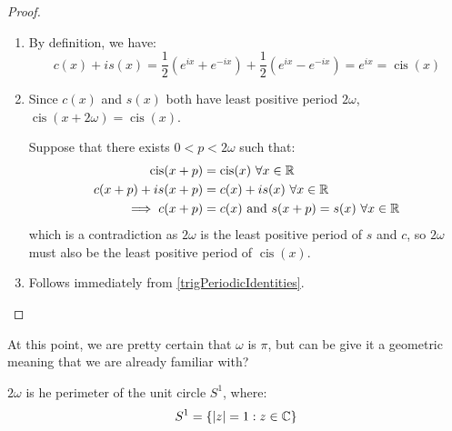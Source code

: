 \documentclass[../main.tex]{subfiles}
\begin{document}
\begin{proof}
  \begin{enumerate}
    \item By definition, we have:
      \[
        c(x) + is(x) = \frac{1}{2}(e^{ix} + e^{-ix}) + \frac{1}{2}(e^{ix} - e^{-ix}) = e^{ix} = \operatorname{cis}(x)
      \]
    \item Since $c(x)$ and $s(x)$ both have least positive period $2\omega$, $\operatorname{cis}(x + 2\omega) = \operatorname{cis}(x)$.

      Suppose that there exists $0 < p < 2\omega$ such that:
      \begin{align*}
        \operatorname{cis}(x + p) &= \operatorname{cis}(x)\ \forall x \in \R \\
        c(x + p) + is(x + p) &= c(x) + is(x)\ \forall x \in \R \\
        \implies c(x + p) &= c(x) \text{ and } s(x + p) = s(x)\ \forall x \in \R
      \end{align*}
      which is a contradiction as $2\omega$ is the least positive period of $s$ and $c$, so $2\omega$ must also be the least positive period of $\operatorname{cis}(x)$.
    \item Follows immediately from \cref{trigPeriodicIdentities}.
  \end{enumerate}
\end{proof}
At this point, we are pretty certain that $\omega$ is $\pi$, but can be give it a geometric meaning that we are already familiar with?
\begin{lemma}
  $2\omega$ is he perimeter of the unit circle $S^{1}$, where:
  \[
    S^{1} = \{|z| = 1: z \in \mathbb{C}\}
  \]
\end{lemma}
\end{document}
